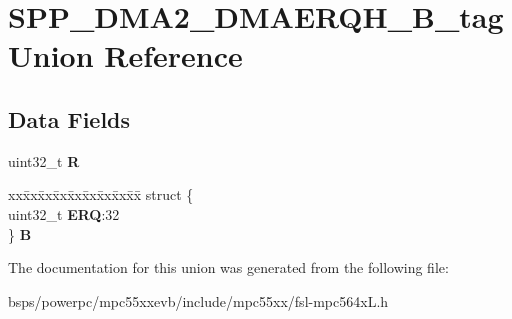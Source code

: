 \hypertarget{unionSPP__DMA2__DMAERQH__32B__tag}{}\section{S\+P\+P\+\_\+\+D\+M\+A2\+\_\+\+D\+M\+A\+E\+R\+Q\+H\+\_\+B\+\_\+tag Union Reference}
\label{unionSPP__DMA2__DMAERQH__32B__tag}
\subsection*{Data Fields}
\begin{DoxyCompactItemize}
\item 
\mbox{\label{unionSPP__DMA2__DMAERQH__32B__tag_a6c0695ad1028f94538be64e061e39084}} 
uint32\+\_\+t {\bfseries R}
\item 
\mbox{\label{unionSPP__DMA2__DMAERQH__32B__tag_a37b3567a93d6fdafbae32f9b2de982ca}} 
\begin{tabbing}
xx\=xx\=xx\=xx\=xx\=xx\=xx\=xx\=xx\=\kill
struct \{\\
\>uint32\_t {\bfseries ERQ}:32\\
\} {\bfseries B}\\

\end{tabbing}\end{DoxyCompactItemize}


The documentation for this union was generated from the following file\+:\begin{DoxyCompactItemize}
\item 
bsps/powerpc/mpc55xxevb/include/mpc55xx/fsl-\/mpc564x\+L.\+h\end{DoxyCompactItemize}
